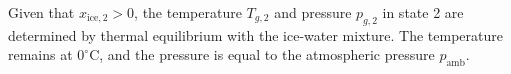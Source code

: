 Given that \( x_{\text{ice},2} > 0 \), the temperature \( T_{g,2} \) and pressure \( p_{g,2} \) in state 2 are determined by thermal equilibrium with the ice-water mixture. The temperature remains at \( 0^\circ\text{C} \), and the pressure is equal to the atmospheric pressure \( p_{\text{amb}} \).